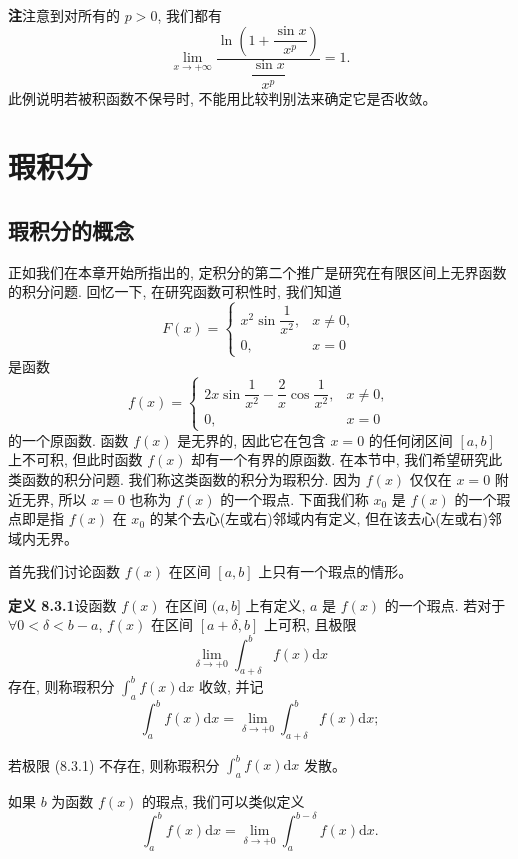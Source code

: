 \documentclass[UTF8, 12pt, fontset=fandol, oneside]{ctexart}
\begin{document}
\noindent\textbf{注}\quad 注意到对所有的 $p>0$, 我们都有
\[
  \lim_{x\to+\infty}
  \frac{\ln\left(1+\dfrac{\sin x}{x^p}\right)}{\dfrac{\sin x}{x^p}}
  =
  1.
\]
此例说明若被积函数不保号时, 不能用比较判别法来确定它是否收敛。

\section{瑕积分}

\subsection{瑕积分的概念}

正如我们在本章开始所指出的, 定积分的第二个推广是研究在有限区间上无界函数的积分问题. 回忆一下, 在研究函数可积性时, 我们知道
\[
  F(x)=
  \begin{cases}
    x^2\sin\dfrac1{x^2}, & x\ne0,\\
    0, & x=0
  \end{cases}
\]
是函数
\[
  f(x)=
  \begin{cases}
    2x\sin\dfrac1{x^2}-\dfrac2x\cos\dfrac1{x^2}, & x\ne0,\\
    0, & x=0
  \end{cases}
\]
的一个原函数. 函数 $f(x)$ 是无界的, 因此它在包含 $x=0$ 的任何闭区间 $[a,b]$ 上不可积, 但此时函数 $f(x)$ 却有一个有界的原函数. 在本节中, 我们希望研究此类函数的积分问题. 我们称这类函数的积分为瑕积分. 因为 $f(x)$ 仅仅在 $x=0$ 附近无界, 所以 $x=0$ 也称为 $f(x)$ 的一个瑕点. 下面我们称 $x_0$ 是 $f(x)$ 的一个瑕点即是指 $f(x)$ 在 $x_0$ 的某个去心(左或右)邻域内有定义, 但在该去心(左或右)邻域内无界。

首先我们讨论函数 $f(x)$ 在区间 $[a,b]$ 上只有一个瑕点的情形。

\noindent\textbf{定义 8.3.1}\quad 设函数 $f(x)$ 在区间 $(a,b]$ 上有定义, $a$ 是 $f(x)$ 的一个瑕点. 若对于 $\forall 0<\delta<b-a$, $f(x)$ 在区间 $[a+\delta,b]$ 上可积, 且极限
\begin{equation}
  \lim_{\delta\to+0}\int_{a+\delta}^b f(x)\mathrm dx
  \tag{8.3.1}
\end{equation}
存在, 则称瑕积分 $\int_a^b f(x)\mathrm dx$ 收敛, 并记
\[
  \int_a^b f(x)\mathrm dx
  =
  \lim_{\delta\to+0}\int_{a+\delta}^b f(x)\mathrm dx;
\]

若极限 (8.3.1) 不存在, 则称瑕积分 $\int_a^b f(x)\mathrm dx$ 发散。

如果 $b$ 为函数 $f(x)$ 的瑕点, 我们可以类似定义
\[
  \int_a^b f(x)\mathrm dx
  =
  \lim_{\delta\to+0}\int_a^{b-\delta}f(x)\mathrm dx.
\]
\end{document}
